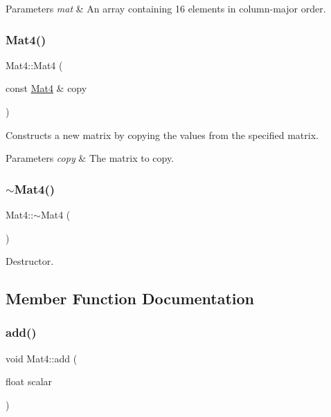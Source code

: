 \begin{DoxyParams}{Parameters}
{\em mat} & An array containing 16 elements in column-\/major order. \\
\hline
\end{DoxyParams}
\mbox{\label{classMat4_a67ddcbb4713bb335042aef3b14324456}} 
\subsubsection{\texorpdfstring{Mat4()}{Mat4()}\hspace{0.1cm}{\footnotesize\ttfamily [8/8]}}
{\footnotesize\ttfamily Mat4\+::\+Mat4 (\begin{DoxyParamCaption}\item[{const \hyperlink{classMat4}{Mat4} \&}]{copy }\end{DoxyParamCaption})}

Constructs a new matrix by copying the values from the specified matrix.


\begin{DoxyParams}{Parameters}
{\em copy} & The matrix to copy. \\
\hline
\end{DoxyParams}
\mbox{\label{classMat4_a72fac55214c733b56248d2b321aaf69b}} 
\subsubsection{\texorpdfstring{$\sim$\+Mat4()}{~Mat4()}\hspace{0.1cm}{\footnotesize\ttfamily [2/2]}}
{\footnotesize\ttfamily Mat4\+::$\sim$\+Mat4 (\begin{DoxyParamCaption}{ }\end{DoxyParamCaption})}

Destructor. 

\subsection{Member Function Documentation}
\mbox{\label{classMat4_aa33c5fad52aba88880b36d95c6ae85ae}} 
\subsubsection{\texorpdfstring{add()}{add()}\hspace{0.1cm}{\footnotesize\ttfamily [1/8]}}
{\footnotesize\ttfamily void Mat4\+::add (\begin{DoxyParamCaption}\item[{float}]{scalar }\end{DoxyParamCaption})}

